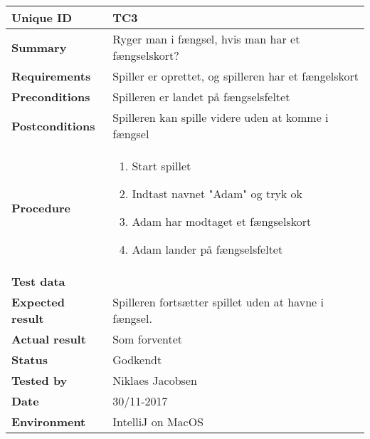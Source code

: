 \begin{table}[H]
    \begin{center}
        \begin{tabular}{|l|p{8cm}|}
            \hline
            \textbf{Unique ID} & TC3 \\
            \hline
            \textbf{Summary} & Ryger man i fængsel, hvis man har et fængselskort? \\
            \hline
            \textbf{Requirements} & Spiller er oprettet, og spilleren har et fængelskort\\
            \hline
            \textbf{Preconditions} & Spilleren er landet på fængselsfeltet\\
            \hline
            \textbf{Postconditions} & Spilleren kan spille videre uden at komme i fængsel\\
            \hline
            \textbf{Procedure} & \begin{enumerate}
                \setlength\itemsep{0ex}
                \item Start spillet
                \item Indtast navnet "Adam" og tryk ok
                \item Adam har modtaget et fængselskort
                \item Adam lander på fængselsfeltet
            \end{enumerate} \\
            \hline
            \textbf{Test data} & \begin{itemize}
                \setlength\itemsep{0ex}
            \end{itemize} \\
            \hline
            \textbf{Expected result} & Spilleren fortsætter spillet uden at havne i fængsel. \\
            \hline
            \textbf{Actual result} & Som forventet \\
            \hline
            \textbf{Status} & Godkendt \\
            \hline
            \textbf{Tested by} & Niklaes Jacobsen \\
            \hline
            \textbf{Date} & 30/11-2017 \\
            \hline
            \textbf{Environment} & IntelliJ on MacOS \\
            \hline
        \end{tabular}
    \end{center}
\end{table}


